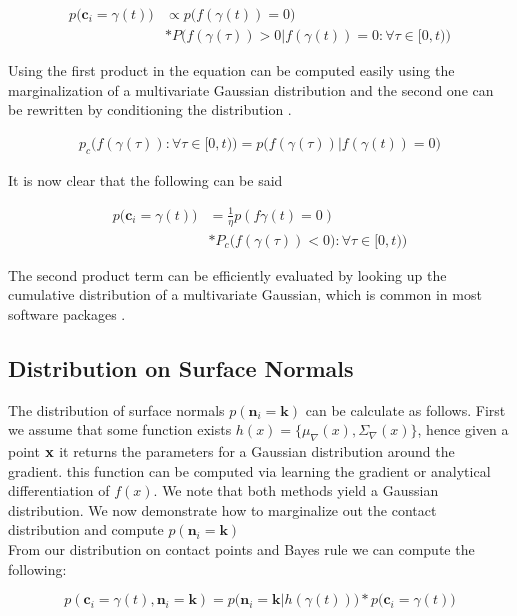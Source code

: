 \documentclass[letterpaper, 10 pt, conference]{ieeeconf}  %
\begin{document}
\begin{align*}
p\big(\textbf{c}_i = \gamma(t)\big) &\propto p\big(f(\gamma(t)) = 0\big)\\
               &*P\big(f(\gamma(\tau)) > 0 | f(\gamma(t)) = 0: \forall \tau \in [0,t)\big)
\end{align*}

Using the first product in the equation can be computed easily using the marginalization of a multivariate Gaussian distribution and the second one can be rewritten by conditioning the distribution \cite{petersen2008matrix}. 

\begin{align*}
p_c\big(f(\gamma(\tau)): \forall \tau \in [0,t)\big) = p\big(f(\gamma(\tau))  | f(\gamma(t)) = 0\big)  
\end{align*}


It is now clear that the following can be said

\begin{align*}
p\big(\textbf{c}_i = \gamma(t)\big) &= \frac{1}{\eta} p(f\gamma(t) = 0) \\
				   &*P_c\big(f(\gamma(\tau)) < 0): \forall \tau \in [0,t)\big)			 
\end{align*} 

The second product term can be efficiently evaluated by looking up the cumulative distribution of a multivariate Gaussian, which is common in most software packages \cite{matlab}.

\subsection{Distribution on Surface Normals} 
The distribution of surface normals $p(\textbf{n}_i = \textbf{k})$ can be calculate as follows.
First we assume that some function exists $h(x) = \lbrace \mu_{\nabla}(x), \Sigma_{\nabla}(x) \rbrace$, hence given a point $\bf{x}$ it returns the parameters for a Gaussian distribution around the gradient.
this function can be computed via learning the gradient \cite{solak2003derivative} or analytical differentiation of $f(x)$.
We note that both methods yield a Gaussian distribution.
We now demonstrate how to marginalize out the contact distribution and compute $p(\textbf{n}_i = \textbf{k})$\\

From our distribution on contact points and Bayes rule we can compute the following: 

\begin{equation}
p(\textbf{c}_i = \gamma(t), \textbf{n}_i = \textbf{k}) = p\big(\textbf{n}_i = \textbf{k} | h(\gamma(t))\big)*p\big(\textbf{c}_i = \gamma(t)\big)
\end{equation}
\end{document}
